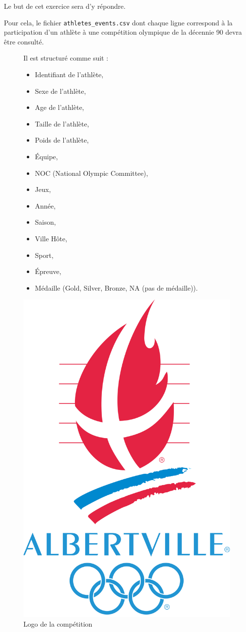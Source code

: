 Le but de cet exercice sera d'y répondre.

Pour cela, le fichier \verb?athletes_events.csv? dont chaque ligne correspond à la participation d'un athlète à une compétition olympique de la décennie 90 devra être consulté.

\begin{figure}[!ht]
\begin{minipage}{0.45\linewidth}
Il est structuré comme suit :
\begin{itemize}
 \item Identifiant de l'athlète,
 \item Sexe de l'athlète,
 \item Age de l'athlète,
 \item Taille de l'athlète,
 \item Poids de l'athlète,
 \item Équipe,
 \item NOC (National Olympic Committee),
 \item Jeux,
 \item Année,
 \item Saison,
 \item Ville Hôte,
 \item Sport,
 \item Épreuve,
 \item Médaille (Gold, Silver, Bronze, NA (pas de médaille)).
\end{itemize}  
\end{minipage}\hfill
\begin{minipage}{0.45\linewidth}
\begin{center}
	\includegraphics[width=0.6\linewidth]{img/Logo_Albertville.png}
	\caption{Logo de la compétition}
	\label{img01}
\end{center}
\end{minipage}
\end{figure}

